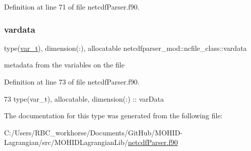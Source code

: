 Definition at line 71 of file netcdf\+Parser.\+f90.

\mbox{\label{structnetcdfparser__mod_1_1ncfile__class_af4da1e5ae03037a7a8a8543713dcb8cd}} 
\subsubsection{\texorpdfstring{vardata}{vardata}}
{\footnotesize\ttfamily type(\mbox{\hyperlink{structnetcdfparser__mod_1_1var__t}{var\+\_\+t}}), dimension(\+:), allocatable netcdfparser\+\_\+mod\+::ncfile\+\_\+class\+::vardata\hspace{0.3cm}{\ttfamily [private]}}



metadata from the variables on the file 



Definition at line 73 of file netcdf\+Parser.\+f90.


\begin{DoxyCode}
73         \textcolor{keywordtype}{type}(var\_t), \textcolor{keywordtype}{allocatable}, \textcolor{keywordtype}{dimension(:)} :: varData
\end{DoxyCode}


The documentation for this type was generated from the following file\+:\begin{DoxyCompactItemize}
\item 
C\+:/\+Users/\+R\+B\+C\+\_\+workhorse/\+Documents/\+Git\+Hub/\+M\+O\+H\+I\+D-\/\+Lagrangian/src/\+M\+O\+H\+I\+D\+Lagrangian\+Lib/\mbox{\hyperlink{netcdf_parser_8f90}{netcdf\+Parser.\+f90}}\end{DoxyCompactItemize}

